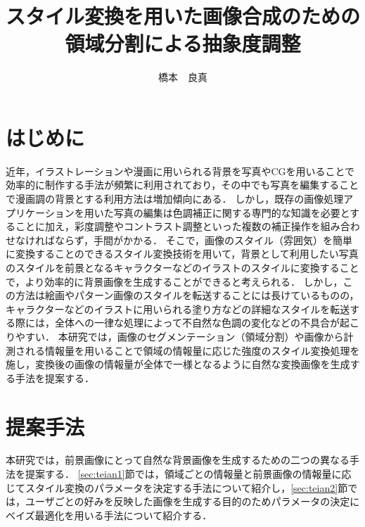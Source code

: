 \documentclass[twocolumn,a4j,dvipdfmx]{jsarticle_customized1}
\author{橋本　良真}
\title{スタイル変換を用いた画像合成のための領域分割による抽象度調整}
\begin{document}
\twocolumn[\maketitle \vspace{0.0zw}]

\setlength{\baselineskip}{13.2pt}
\setlength{\abovecaptionskip}{0pt}
\setlength{\belowcaptionskip}{-5pt}

\section{はじめに}\label{sec:introduction}
近年，イラストレーションや漫画に用いられる背景を写真やCGを用いることで効率的に制作する手法が頻繁に利用されており，その中でも写真を編集することで漫画調の背景とする利用方法は増加傾向にある．
しかし，既存の画像処理アプリケーションを用いた写真の編集は色調補正に関する専門的な知識を必要とすることに加え，彩度調整やコントラスト調整といった複数の補正操作を組み合わせなければならず，手間がかかる．
そこで，画像のスタイル（雰囲気）を簡単に変換することのできるスタイル変換技術を用いて，背景として利用したい写真のスタイルを前景となるキャラクターなどのイラストのスタイルに変換することで，より効率的に背景画像を生成することができると考えられる．
しかし，この方法は絵画やパターン画像のスタイルを転送することには長けているものの，キャラクターなどのイラストに用いられる塗り方などの詳細なスタイルを転送する際には，全体への一律な処理によって不自然な色調の変化などの不具合が起こりやすい．
本研究では，画像のセグメンテーション（領域分割）や画像から計測される情報量を用いることで領域の情報量に応じた強度のスタイル変換処理を施し，変換後の画像の情報量が全体で一様となるように自然な変換画像を生成する手法を提案する．

\section{提案手法}\label{sec:proposed_method}
本研究では，前景画像にとって自然な背景画像を生成するための二つの異なる手法を提案する．
\ref{sec:teian1}節では，領域ごとの情報量と前景画像の情報量に応じてスタイル変換のパラメータを決定する手法について紹介し，\ref{sec:teian2}節では，ユーザごとの好みを反映した画像を生成する目的のためパラメータの決定にベイズ最適化を用いる手法について紹介する．

\end{document}
